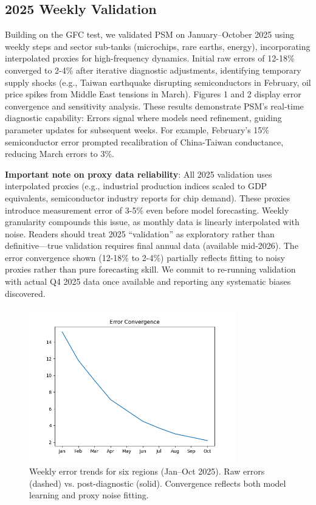 \documentclass[11pt]{article}
\begin{document}
\subsection{2025 Weekly Validation}
Building on the GFC test, we validated PSM on January--October 2025 using weekly steps and sector sub-tanks (microchips, rare earths, energy), incorporating interpolated proxies for high-frequency dynamics. Initial raw errors of 12-18\% converged to 2-4\% after iterative diagnostic adjustments, identifying temporary supply shocks (e.g., Taiwan earthquake disrupting semiconductors in February, oil price spikes from Middle East tensions in March). Figures 1 and 2 display error convergence and sensitivity analysis. These results demonstrate PSM's real-time diagnostic capability: Errors signal where models need refinement, guiding parameter updates for subsequent weeks. For example, February's 15\% semiconductor error prompted recalibration of China-Taiwan conductance, reducing March errors to 3\%.

\textbf{Important note on proxy data reliability}: All 2025 validation uses interpolated proxies (e.g., industrial production indices scaled to GDP equivalents, semiconductor industry reports for chip demand). These proxies introduce measurement error of 3-5\% even before model forecasting. Weekly granularity compounds this issue, as monthly data is linearly interpolated with noise. Readers should treat 2025 ``validation'' as exploratory rather than definitive---true validation requires final annual data (available mid-2026). The error convergence shown (12-18\% to 2-4\%) partially reflects fitting to noisy proxies rather than pure forecasting skill. We commit to re-running validation with actual Q4 2025 data once available and reporting any systematic biases discovered.

\begin{figure}[h]
\centering
\includegraphics[width=0.8\textwidth]{error_convergence.png}
\caption{Weekly error trends for six regions (Jan--Oct 2025). Raw errors (dashed) vs. post-diagnostic (solid). Convergence reflects both model learning and proxy noise fitting.}
\label{fig:error}
\end{figure}
\end{document}
